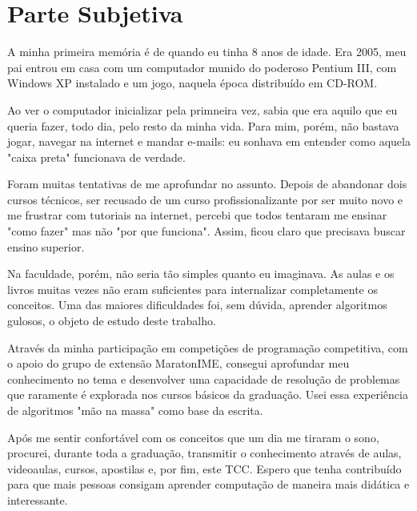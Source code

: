 \chapter{Parte Subjetiva}
\label{subjetiva}


A minha primeira memória é de quando eu tinha 8 anos de idade. Era 2005, meu pai entrou em casa com um computador munido do poderoso Pentium III, com Windows XP instalado e um jogo, naquela época distribuído em CD-ROM.

Ao ver o computador inicializar pela primneira vez, sabia que era aquilo que eu queria fazer, todo dia, pelo resto da minha vida. Para mim, porém, não bastava jogar, navegar na internet e mandar e-mails: eu sonhava em entender como aquela "caixa preta" funcionava de verdade.

Foram muitas tentativas de me aprofundar no assunto. Depois de abandonar dois cursos técnicos, ser recusado de um curso profissionalizante por ser muito novo e me frustrar com tutoriais na internet, percebi que todos tentaram me ensinar "como fazer" mas não "por que funciona". Assim, ficou claro que precisava buscar ensino superior.

Na faculdade, porém, não seria tão simples quanto eu imaginava. As aulas e os livros muitas vezes não eram suficientes para internalizar completamente os conceitos. Uma das maiores dificuldades foi, sem dúvida, aprender algoritmos gulosos, o objeto de estudo deste trabalho.

Através da minha participação em competições de programação competitiva, com o apoio do grupo de extensão MaratonIME, consegui aprofundar meu conhecimento no tema e desenvolver uma capacidade de resolução de problemas que raramente é explorada nos cursos básicos da graduação. Usei essa experiência de algoritmos "mão na massa" como base da escrita.  

Após me sentir confortável com os conceitos que um dia me tiraram o sono, procurei, durante toda a graduação, transmitir o conhecimento através de aulas, videoaulas, cursos, apostilas e, por fim, este TCC. Espero que tenha contribuído para que mais pessoas consigam aprender computação de maneira mais didática e interessante.